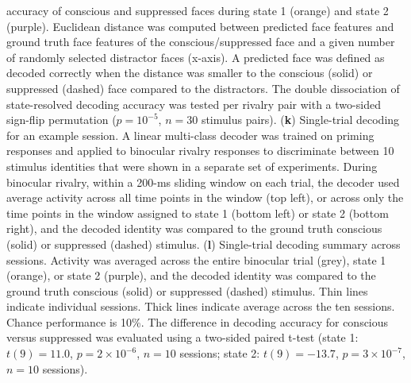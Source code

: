\documentclass{article}
\begin{document}
accuracy of conscious and suppressed faces during state 1 (orange) and state 2 (purple). Euclidean distance was computed between predicted face features and ground truth face features of the conscious/suppressed face and a given number of randomly selected distractor faces (x-axis). A predicted face was defined as decoded correctly when the distance was smaller to the conscious (solid) or suppressed (dashed) face compared to the distractors. The double dissociation of state-resolved decoding accuracy was tested per rivalry pair with a two-sided sign-flip permutation ($p = 10^{-5}$, $n = 30$ stimulus pairs). (\textbf{k}) Single-trial decoding for an example session. A linear multi-class decoder was trained on priming responses and applied to binocular rivalry responses to discriminate between 10 stimulus identities that were shown in a separate set of experiments. During binocular rivalry, within a 200-ms sliding window on each trial, the decoder used average activity across all time points in the window (top left), or across only the time points in the window assigned to state 1 (bottom left) or state 2 (bottom right), and the decoded identity was compared to the ground truth conscious (solid) or suppressed (dashed) stimulus. (\textbf{l}) Single-trial decoding summary across sessions. Activity was averaged across the entire binocular trial (grey), state 1 (orange), or state 2 (purple), and the decoded identity was compared to the ground truth conscious (solid) or suppressed (dashed) stimulus. Thin lines indicate individual sessions. Thick lines indicate average across the ten sessions. Chance performance is 10\%. The difference in decoding accuracy for conscious versus suppressed was evaluated using a two-sided paired t-test (state 1: $t(9) = 11.0$, $p = 2 \times 10^{-6}$, $n = 10$ sessions; state 2: $t(9) = -13.7$, $p = 3 \times 10^{-7}$, $n = 10$ sessions).
\end{document}

